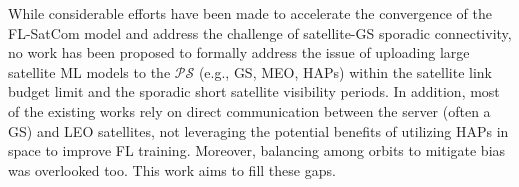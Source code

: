 \documentclass[letter,journal]{IEEEtran}
\newcommand{\red}[1]{\textcolor{red}{[#1]}}
\begin{document}
While considerable efforts have been made to accelerate the convergence of the FL-SatCom model and address the challenge of satellite-GS sporadic connectivity, no work has been proposed to formally address the issue of uploading large satellite ML models to the $\mathcal {PS}$ (e.g., GS, MEO, HAPs) within the satellite link budget limit and the sporadic short satellite visibility periods. In addition, most of the existing works rely on direct communication between the server (often a GS) and LEO satellites, not leveraging the potential benefits of utilizing HAPs in space to improve FL training. Moreover, balancing among orbits to mitigate bias was overlooked too. This work aims to fill these gaps.

\end{document}
